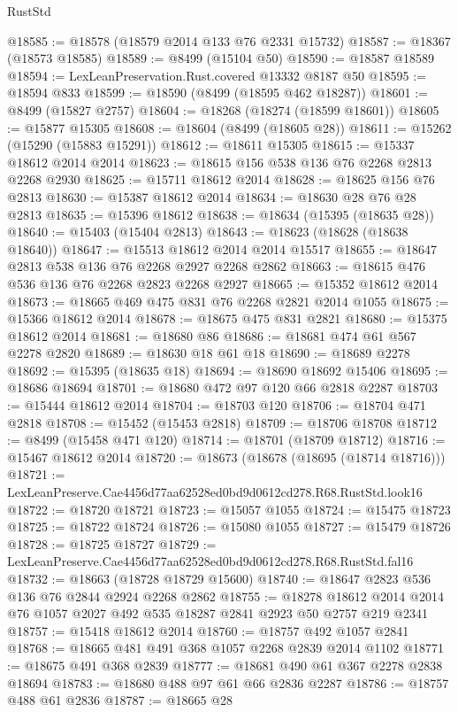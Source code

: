 \begin{lexlean}{RustStd}
\begin{coremodule}
@18585 := @18578 (@18579 @2014 @133 @76 @2331 @15732)
@18587 := @18367 (@18573 @18585)
@18589 := @8499 (@15104 @50)
@18590 := @18587 @18589
@18594 := LexLeanPreservation.Rust.covered @13332 @8187 @50
@18595 := @18594 @833
@18599 := @18590 (@8499 (@18595 @462 @18287))
@18601 := @8499 (@15827 @2757)
@18604 := @18268 (@18274 (@18599 @18601))
@18605 := @15877 @15305
@18608 := @18604 (@8499 (@18605 @28))
@18611 := @15262 (@15290 (@15883 @15291))
@18612 := @18611 @15305
@18615 := @15337 @18612 @2014 @2014
@18623 := @18615 @156 @538 @136 @76 @2268 @2813 @2268 @2930
@18625 := @15711 @18612 @2014
@18628 := @18625 @156 @76 @2813
@18630 := @15387 @18612 @2014
@18634 := @18630 @28 @76 @28 @2813
@18635 := @15396 @18612
@18638 := @18634 (@15395 (@18635 @28))
@18640 := @15403 (@15404 @2813)
@18643 := @18623 (@18628 (@18638 @18640))
@18647 := @15513 @18612 @2014 @2014 @15517
@18655 := @18647 @2813 @538 @136 @76 @2268 @2927 @2268 @2862
@18663 := @18615 @476 @536 @136 @76 @2268 @2823 @2268 @2927
@18665 := @15352 @18612 @2014
@18673 := @18665 @469 @475 @831 @76 @2268 @2821 @2014 @1055
@18675 := @15366 @18612 @2014
@18678 := @18675 @475 @831 @2821
@18680 := @15375 @18612 @2014
@18681 := @18680 @86
@18686 := @18681 @474 @61 @567 @2278 @2820
@18689 := @18630 @18 @61 @18
@18690 := @18689 @2278
@18692 := @15395 (@18635 @18)
@18694 := @18690 @18692 @15406
@18695 := @18686 @18694
@18701 := @18680 @472 @97 @120 @66 @2818 @2287
@18703 := @15444 @18612 @2014
@18704 := @18703 @120
@18706 := @18704 @471 @2818
@18708 := @15452 (@15453 @2818)
@18709 := @18706 @18708
@18712 := @8499 (@15458 @471 @120)
@18714 := @18701 (@18709 @18712)
@18716 := @15467 @18612 @2014
@18720 := @18673 (@18678 (@18695 (@18714 @18716)))
@18721 := LexLeanPreserve.Cae4456d77aa62528ed0bd9d0612cd278.R68.RustStd.look16
@18722 := @18720 @18721
@18723 := @15057 @1055
@18724 := @15475 @18723
@18725 := @18722 @18724
@18726 := @15080 @1055
@18727 := @15479 @18726
@18728 := @18725 @18727
@18729 := LexLeanPreserve.Cae4456d77aa62528ed0bd9d0612cd278.R68.RustStd.fal16
@18732 := @18663 (@18728 @18729 @15600)
@18740 := @18647 @2823 @536 @136 @76 @2844 @2924 @2268 @2862
@18755 := @18278
    @18612
    @2014
    @2014
    @76
    @1057
    @2027
    @492
    @535
    @18287
    @2841
    @2923
    @50
    @2757
    @219
    @2341
@18757 := @15418 @18612 @2014
@18760 := @18757 @492 @1057 @2841
@18768 := @18665 @481 @491 @368 @1057 @2268 @2839 @2014 @1102
@18771 := @18675 @491 @368 @2839
@18777 := @18681 @490 @61 @367 @2278 @2838 @18694
@18783 := @18680 @488 @97 @61 @66 @2836 @2287
@18786 := @18757 @488 @61 @2836
@18787 := @18665 @28

\end{coremodule}
\end{lexlean}
